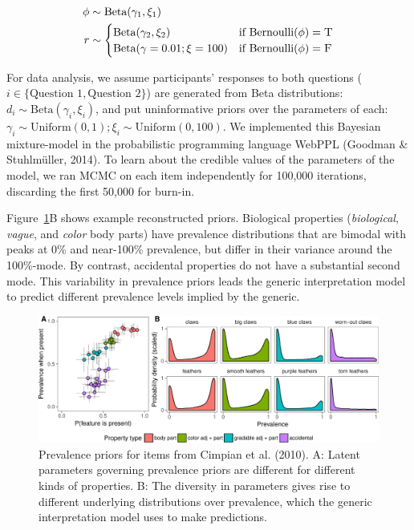 \documentclass[floatsintext,doc]{apa6}
\theoremstyle{definition}
\theoremstyle{definition}
\theoremstyle{definition}
\theoremstyle{remark}
\begin{document}
\begin{align}
\phi & \sim \text{Beta}(\gamma_1, \xi_1) \nonumber \\ 
r & \sim \begin{cases}
        \text{Beta}(\gamma_2, \xi_2) &\mbox{if } \text{Bernoulli}(\phi) = \textsc{T} \label{eq:priorModel}  \\
        \text{Beta}(\gamma = 0.01; \xi = 100) &\mbox{if } \text{Bernoulli}(\phi) = \textsc{F} \\
        \end{cases}
\end{align}

For data analysis, we assume participants' responses to both questions
(\(i \in \{\text{Question 1}, \text{Question 2}\}\)) are generated from
Beta distributions: \(d_{i} \sim \text{Beta}(\gamma_i, \xi_i)\), and put
uninformative priors over the parameters of each:
\(\gamma_i \sim \text{Uniform}(0, 1); \xi_i \sim \text{Uniform}(0, 100)\).
We implemented this Bayesian mixture-model in the probabilistic
programming language WebPPL (Goodman \& Stuhlmüller, 2014). To learn
about the credible values of the parameters of the model, we ran MCMC on
each item independently for 100,000 iterations, discarding the first
50,000 for burn-in.

Figure~\ref{fig:cimpian-prevPrior}B shows example reconstructed priors.
Biological properties (\emph{biological}, \emph{vague}, and \emph{color}
body parts) have prevalence distributions that are bimodal with peaks at
0\% and near-100\% prevalence, but differ in their variance around the
100\%-mode. By contrast, accidental properties do not have a substantial
second mode. This variability in prevalence priors leads the generic
interpretation model to predict different prevalence levels implied by
the generic.

\begin{figure}
\centering
\includegraphics{genint_files/figure-latex/cimpian-prevPrior-1.pdf}
\caption{\label{fig:cimpian-prevPrior}Prevalence priors for items from
Cimpian et al. (2010). A: Latent parameters governing prevalence priors
are different for different kinds of properties. B: The diversity in
parameters gives rise to different underlying distributions over
prevalence, which the generic interpretation model uses to make
predictions.}
\end{figure}
\end{document}
